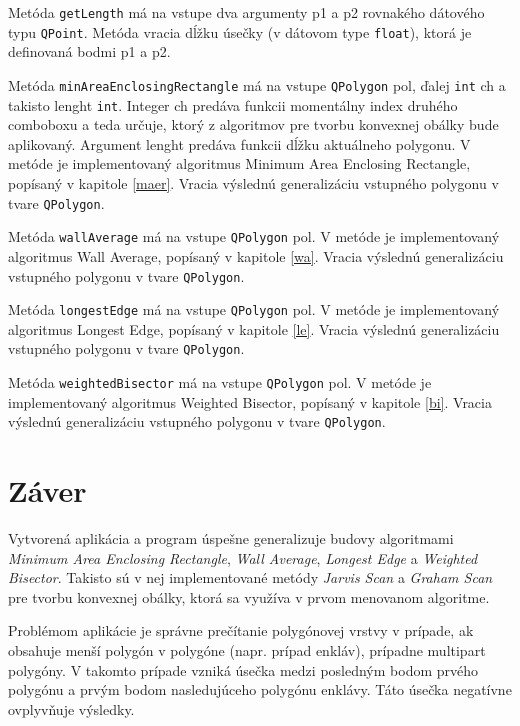 \documentclass[11pt]{article}
\begin{document}
\begin{enumerate}
Metóda \texttt{getLength} má na vstupe dva argumenty p1 a p2 rovnakého dátového typu \texttt{QPoint}. Metóda vracia dĺžku úsečky (v dátovom type \texttt{float}), ktorá je definovaná bodmi p1 a p2. 

Metóda \texttt{minAreaEnclosingRectangle} má na vstupe \texttt{QPolygon} pol, ďalej \texttt{int} ch a takisto lenght \texttt{int}. Integer ch predáva funkcii momentálny index druhého comboboxu a teda určuje, ktorý z algoritmov pre tvorbu konvexnej obálky bude aplikovaný. Argument lenght predáva funkcii dĺžku aktuálneho polygonu. V metóde je implementovaný algoritmus Minimum Area Enclosing Rectangle, popísaný v kapitole \ref{maer}. Vracia výslednú generalizáciu vstupného polygonu v tvare \texttt{QPolygon}. 

Metóda \texttt{wallAverage} má na vstupe \texttt{QPolygon} pol. V metóde je implementovaný algoritmus Wall Average, popísaný v kapitole \ref{wa}. Vracia výslednú generalizáciu vstupného polygonu v tvare \texttt{QPolygon}. 

Metóda \texttt{longestEdge} má na vstupe \texttt{QPolygon} pol. V metóde je implementovaný algoritmus Longest Edge, popísaný v kapitole \ref{le}. Vracia výslednú generalizáciu vstupného polygonu v tvare \texttt{QPolygon}. 

Metóda \texttt{weightedBisector} má na vstupe \texttt{QPolygon} pol. V metóde je implementovaný algoritmus Weighted Bisector, popísaný v kapitole \ref{bi}. Vracia výslednú generalizáciu vstupného polygonu v tvare \texttt{QPolygon}. 
 
\end{enumerate}

\newpage
\section{Záver}

Vytvorená aplikácia a program úspešne generalizuje budovy algoritmami \textit{Minimum Area Enclosing Rectangle}, \textit{Wall Average}, \textit{Longest Edge} a \textit{Weighted Bisector}. Takisto sú v nej implementované metódy \textit{Jarvis Scan} a \textit{Graham Scan} pre tvorbu konvexnej obálky, ktorá sa využíva v prvom menovanom algoritme.

Problémom aplikácie je správne prečítanie polygónovej vrstvy v prípade, ak obsahuje menší polygón v polygóne (napr. prípad enkláv), prípadne multipart polygóny. V takomto prípade vzniká úsečka medzi posledným bodom prvého polygónu a prvým bodom nasledujúceho polygónu enklávy. Táto úsečka negatívne ovplyvňuje výsledky.
\end{document}
